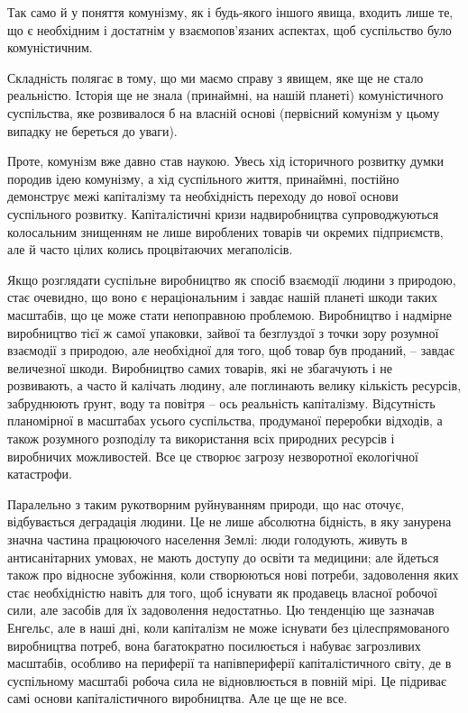\documentclass[../main]{subfiles}
\begin{document}
Так само й у поняття комунізму, як і будь-якого іншого явища, входить лише те, що є необхідним і достатнім у взаємопов’язаних аспектах, щоб суспільство було комуністичним.

Складність полягає в тому, що ми маємо справу з явищем, яке ще не стало реальністю. Історія ще не знала (принаймні, на нашій планеті) комуністичного суспільства, яке розвивалося б на власній основі (первісний комунізм у цьому випадку не береться до уваги).

Проте, комунізм вже давно став наукою. Увесь хід історичного розвитку думки породив ідею комунізму, а хід суспільного життя, принаймні, постійно демонструє межі капіталізму та необхідність переходу до нової основи суспільного розвитку. Капіталістичні кризи надвиробництва супроводжуються колосальним знищенням не лише вироблених товарів чи окремих підприємств, але й часто цілих колись процвітаючих мегаполісів.

Якщо розглядати суспільне виробництво як спосіб взаємодії людини з природою, стає очевидно, що воно є нераціональним і завдає нашій планеті шкоди таких масштабів, що це може стати непоправною проблемою. Виробництво і надмірне виробництво тієї ж самої упаковки, зайвої та безглуздої з точки зору розумної взаємодії з природою, але необхідної для того, щоб товар був проданий, – завдає величезної шкоди. Виробництво самих товарів, які не збагачують і не розвивають, а часто й калічать людину, але поглинають велику кількість ресурсів, забруднюють ґрунт, воду та повітря – ось реальність капіталізму. Відсутність планомірної в масштабах усього суспільства, продуманої переробки відходів, а також розумного розподілу та використання всіх природних ресурсів і виробничих можливостей. Все це створює загрозу незворотної екологічної катастрофи.

Паралельно з таким рукотворним руйнуванням природи, що нас оточує, відбувається деградація людини. Це не лише абсолютна бідність, в яку занурена значна частина працюючого населення Землі: люди голодують, живуть в антисанітарних умовах, не мають доступу до освіти та медицини; але йдеться також про відносне зубожіння, коли створюються нові потреби, задоволення яких стає необхідністю навіть для того, щоб існувати як продавець власної робочої сили, але засобів для їх задоволення недостатньо. Цю тенденцію ще зазначав Енгельс, але в наші дні, коли капіталізм не може існувати без цілеспрямованого виробництва потреб, вона багатократно посилюється і набуває загрозливих масштабів, особливо на периферії та напівпериферії капіталістичного світу, де в суспільному масштабі робоча сила не відновлюється в повній мірі. Це підриває самі основи капіталістичного виробництва. Але це ще не все.
\end{document}

